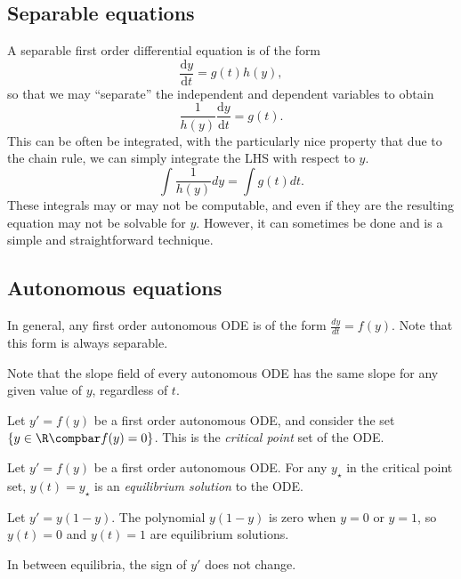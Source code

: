 \documentclass[12pt]{article}
\begin{document}
\subsection{Separable equations}

A separable first order differential equation is of the form
\[\frac{\mathrm{d}y}{\mathrm{d}t} = g(t)h(y),\] so that we may ``separate'' the independent and dependent variables to obtain
\[\frac{1}{h(y)}\frac{\mathrm{d}y}{\mathrm{d}t} = g(t).\] This can be often be integrated, with the particularly nice property that due to the chain rule, we can simply integrate the LHS with respect to $y$.
\[\int \frac{1}{h(y)}dy = \int g(t)dt.\] These integrals may or may not be computable, and even if they are the resulting equation may not be solvable for $y$. However, it can sometimes be done and is a simple and straightforward technique.

\subsection{Autonomous equations}

In general, any first order autonomous ODE is of the form $\frac{dy}{dt} = f(y)$. Note that this form is always separable.

\begin{rmk}
    Note that the slope field of every autonomous ODE has the same slope for any given value of $y$, regardless of $t$.
\end{rmk}

\begin{defn}
    Let $y' = f(y)$ be a first order autonomous ODE, and consider the set $\left\{y \in \R \compbar f(y) = 0 \right\}$. This is the \emph{critical point} set of the ODE.
\end{defn}

\begin{defn}
    Let $y' = f(y)$ be a first order autonomous ODE. For any $y_{\star}$ in the critical point set, $y(t) = y_{\star}$ is an \emph{equilibrium solution} to the ODE.
\end{defn}

\begin{exmp}
    Let $y' = y(1-y)$. The polynomial $y(1-y)$ is zero when $y = 0$ or $y = 1$, so $y(t) = 0$ and $y(t) = 1$ are equilibrium solutions.
\end{exmp}

\begin{rmk}
    In between equilibria, the sign of $y'$ does not change.
\end{rmk}
\end{document}
